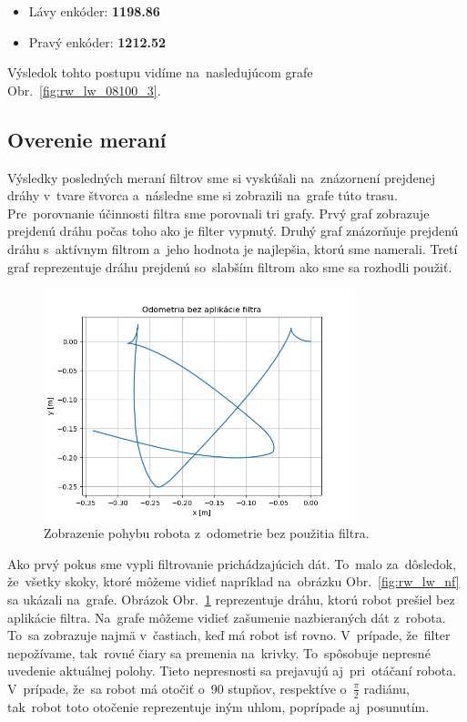 \begin{itemize}
	\item Lávy enkóder: \textbf{1198.86}
\item Pravý enkóder: \textbf{1212.52}
\end{itemize}

Výsledok tohto postupu vidíme na~nasledujúcom grafe Obr.~\ref{fig:rw_lw_08100_3}.

\clearpage

\subsection{Overenie meraní}
\label{subsec:overenie_merani}

Výsledky posledných meraní filtrov sme si vyskúšali na~znázornení prejdenej dráhy v~tvare štvorca a~následne sme si
zobrazili na~grafe túto trasu. Pre~porovnanie účinnosti filtra sme porovnali tri grafy. Prvý graf zobrazuje prejdenú
dráhu počas toho ako je filter vypnutý. Druhý graf znázorňuje prejdenú dráhu s~aktívnym filtrom a~jeho hodnota je
najlepšia, ktorú sme namerali. Tretí graf reprezentuje dráhu prejdenú so~slabším filtrom ako sme sa rozhodli použiť.

\begin{figure}[!htbp]
	\begin{center}
		\includegraphics[width=0.8\textwidth]{img/stvorec_bez_filtra.png}
	\end{center}
	\caption{Zobrazenie pohybu robota z~odometrie bez použitia filtra.}
	\label{fig:stvorecBezFiltra}
\end{figure}

Ako prvý pokus sme vypli filtrovanie prichádzajúcich dát. To~malo za~dôsledok, že~všetky skoky, ktoré môžeme vidieť
napríklad na~obrázku Obr.~\ref{fig:rw_lw_nf} sa ukázali na~grafe. Obrázok Obr.~\ref{fig:stvorecBezFiltra} reprezentuje
dráhu, ktorú robot prešiel bez aplikácie filtra. Na~grafe môžeme vidieť zašumenie nazbieraných dát z~robota. To~sa
zobrazuje najmä v~častiach, keď má robot isť rovno. V~prípade, že~filter nepožívame, tak~rovné čiary sa premenia
na~krivky. To~spôsobuje nepresné uvedenie aktuálnej polohy. Tieto nepresnosti sa prejavujú aj~pri~otáčaní robota.
V~prípade, že~sa robot má otočiť o~90 stupňov, respektíve o~$\frac{\pi}{2}$ radiánu, tak~robot toto otočenie
reprezentuje iným uhlom, poprípade aj~posunutím.


